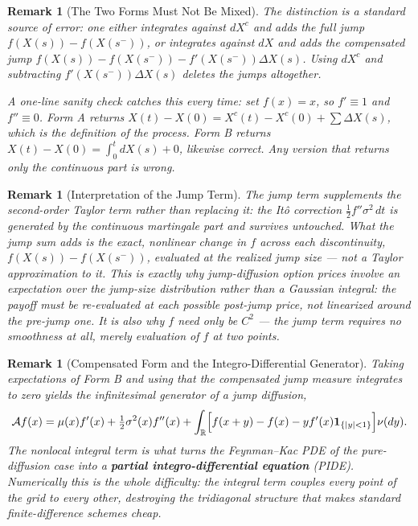 \documentclass{report}
\theoremstyle{spacedplain}
\theoremstyle{spaceddefinition}
\theoremstyle{spacedremark}
\newtheorem{remark}[theorem]{Remark}
\begin{document}
\begin{remark}[The Two Forms Must Not Be Mixed]
The distinction is a standard source of error: one either integrates against $dX^c$ and adds the \emph{full} jump $f(X(s)) - f(X(s^-))$, or integrates against $dX$ and adds the \emph{compensated} jump $f(X(s)) - f(X(s^-)) - f'(X(s^-))\Delta X(s)$. Using $dX^c$ \emph{and} subtracting $f'(X(s^-))\Delta X(s)$ deletes the jumps altogether.

A one-line sanity check catches this every time: set $f(x) = x$, so $f' \equiv 1$ and $f'' \equiv 0$. Form A returns $X(t) - X(0) = X^c(t) - X^c(0) + \sum \Delta X(s)$, which is the definition of the process. Form B returns $X(t)-X(0) = \int_0^t dX(s) + 0$, likewise correct. Any version that returns only the continuous part is wrong.
\end{remark}

\begin{remark}[Interpretation of the Jump Term]
The jump term \emph{supplements} the second-order Taylor term rather than replacing it: the It\^o correction $\tfrac12 f'' \sigma^2\,dt$ is generated by the continuous martingale part and survives untouched. What the jump sum adds is the exact, nonlinear change in $f$ across each discontinuity, $f(X(s)) - f(X(s^-))$, evaluated at the realized jump size --- \emph{not} a Taylor approximation to it. This is exactly why jump-diffusion option prices involve an expectation over the jump-size \emph{distribution} rather than a Gaussian integral: the payoff must be re-evaluated at each possible post-jump price, not linearized around the pre-jump one. It is also why $f$ need only be $C^2$ --- the jump term requires no smoothness at all, merely evaluation of $f$ at two points.
\end{remark}

\begin{remark}[Compensated Form and the Integro-Differential Generator]
Taking expectations of Form B and using that the compensated jump measure integrates to zero yields the infinitesimal generator of a jump diffusion,
\begin{align}
    \mathcal{A}f(x) = \mu(x) f'(x) + \tfrac{1}{2}\sigma^2(x) f''(x) + \int_{\mathbb{R}} \Bigl[ f(x + y) - f(x) - y f'(x)\mathbf{1}_{\{|y|<1\}} \Bigr] \nu(dy).
\end{align}
The nonlocal integral term is what turns the Feynman--Kac PDE of the pure-diffusion case into a \textbf{partial integro-differential equation} (PIDE). Numerically this is the whole difficulty: the integral term couples every point of the grid to every other, destroying the tridiagonal structure that makes standard finite-difference schemes cheap.
\end{remark}
\end{document}
